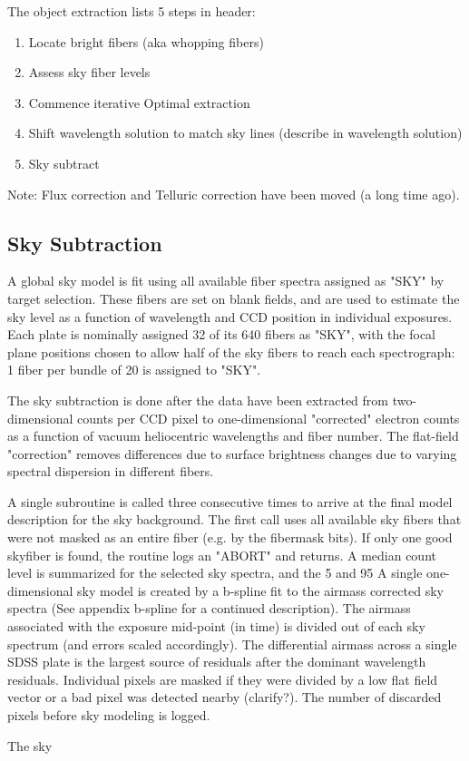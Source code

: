 

The object extraction lists 5 steps in header:

\begin{enumerate}
\item{Locate bright fibers (aka whopping fibers)}
\item{Assess sky fiber levels}
\item{Commence iterative Optimal extraction }
\item{Shift wavelength solution to match sky lines (describe in wavelength solution)}
\item{Sky subtract}

\end{enumerate}

Note: Flux correction and Telluric correction have been moved (a long time ago).


\subsection{Sky Subtraction}

A global sky model is fit using all available fiber spectra assigned as 
"SKY" by target selection.  These fibers are set on blank fields, and are 
used to estimate the sky level as a function of wavelength and CCD position 
in individual exposures.   Each plate is nominally assigned 32 of its 640 
fibers as "SKY", with the focal plane positions chosen to allow half of the 
sky fibers to reach each spectrograph: 1 fiber per bundle of 20 is assigned to 
"SKY".

The sky subtraction is done after the data have been extracted from 
two-dimensional counts per CCD pixel to one-dimensional "corrected" electron 
counts as a function of vacuum heliocentric wavelengths and fiber number.
The flat-field "correction" removes differences due to surface brightness 
changes due to varying spectral dispersion in different fibers.

A single subroutine is called three consecutive times to arrive at the final 
model description for the sky background.  The first call uses all available sky
fibers that were not masked as an entire fiber (e.g. by the fibermask bits).
If only one good skyfiber is found, the routine logs an "ABORT" and returns.
A median count level is summarized for the selected sky spectra, and the 5%
and 95%
A single one-dimensional sky model is created by a b-spline fit to the airmass 
corrected sky spectra (See appendix b-spline for a continued description).
The airmass associated with the exposure mid-point (in time) is divided out 
of each sky spectrum (and errors scaled accordingly).  The differential airmass
across a single SDSS plate is the largest source of residuals after the dominant
wavelength residuals.  Individual pixels are masked if they were divided by a 
low flat field vector or a bad pixel was detected nearby (clarify?).
The number of discarded pixels before sky modeling is logged.

The sky




     

